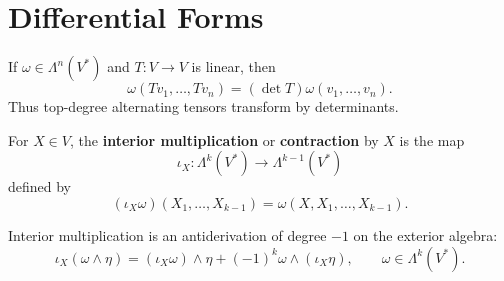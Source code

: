 \documentclass[12pt, oneside]{book}
\begin{document}
\section{Differential Forms}
\begin{proposition}
    If $\omega\in \Lambda^n(V^*)$ and $T:V\rightarrow V$ is linear, then
    \[
        \omega(Tv_1,\ldots,Tv_n)
        =
        (\det T)\omega(v_1,\ldots,v_n).
    \]
    Thus top-degree alternating tensors transform by determinants.
\end{proposition}

\begin{definition}
    For $X\in V$, the \textbf{interior multiplication} or \textbf{contraction} by $X$ is the map
    \[
        \iota_X:\Lambda^k(V^*)\rightarrow \Lambda^{k-1}(V^*)
    \]
    defined by
    \[
        (\iota_X\omega)(X_1,\ldots,X_{k-1})
        =
        \omega(X,X_1,\ldots,X_{k-1}).
    \]
\end{definition}

\begin{proposition}
    Interior multiplication is an antiderivation of degree $-1$ on the exterior algebra:
    \[
        \iota_X(\omega\wedge\eta)
        =
        (\iota_X\omega)\wedge\eta
        +
        (-1)^k\omega\wedge(\iota_X\eta),
        \qquad \omega\in \Lambda^k(V^*).
    \]
\end{proposition}
\end{document}
